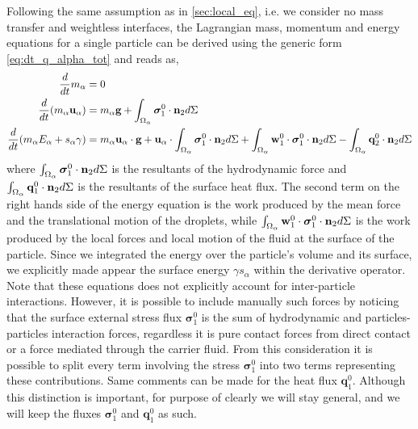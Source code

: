 Following the same assumption as in \ref{sec:local_eq}, i.e. we consider no mass transfer and weightless interfaces, the Lagrangian  mass, momentum and energy equations for a single particle can be derived using the generic form \ref{eq:dt_q_alpha_tot} and reads as, 
\begin{align}
    \label{eq:dt_m_alpha}
    \frac{d}{d t} m_\alpha
    &= 
    0\\
    \label{eq:dt_p_alpha}
    \frac{d}{d t} (m_\alpha \textbf{u}_\alpha)
    &= 
    m_\alpha\textbf{g}
    +  \int_{\Omega_\alpha} \bm{\sigma}_1^0 \cdot \textbf{n}_2 d\Sigma\\
    \label{eq:dt_E_alpha}
    \frac{d}{d t} (m_\alpha E_\alpha + s_\alpha \gamma)
    &= 
    m_\alpha \textbf{u}_\alpha \cdot \textbf{g}
    +\textbf{u}_\alpha \cdot \int_{\Omega_\alpha} \bm{\sigma}_1^0 \cdot \textbf{n}_2 d\Sigma
    +\int_{\Omega_\alpha} \textbf{w}_1^0 \cdot \bm{\sigma}_1^0 \cdot  \textbf{n}_2 d\Sigma 
    - \int_{\Omega_\alpha} \textbf{q}_2^0 \cdot \textbf{n}_2 d\Sigma
\end{align}
where  $\int_{\Omega_\alpha}   \bm{\sigma}_1^0 \cdot \textbf{n}_2  d\Sigma$ is the resultants of the hydrodynamic force and $\int_{\Omega_\alpha}  \textbf{q}_1^0 \cdot \textbf{n}_2  d\Sigma$ is the resultants of the surface heat flux. 
The second term on the right hands side of the energy equation is the work produced by the mean force and the translational motion of the droplets, while $\int_{\Omega_\alpha} \textbf{w}_1^0 \cdot \bm{\sigma}_1^0 \cdot  \textbf{n}_2 d\Sigma$ is the work produced by the local forces and local motion of the fluid at the surface of the particle.
Since we integrated the energy over the particle's volume and its surface, we explicitly made appear the surface energy $\gamma s_\alpha$ within the derivative operator. 
Note that these equations does not explicitly account for inter-particle interactions. 
However, it is possible to include manually such forces by noticing that the surface external stress flux $\bm{\sigma}_1^0$ is the sum of hydrodynamic and particles-particles interaction forces, regardless it is pure contact forces from direct contact or a force mediated through the carrier fluid.
From this consideration it is possible to split every term involving the stress $\bm{\sigma}_1^0$ into two terms representing these contributions. 
Same comments can be made for the heat flux $\textbf{q}_1^0$. 
Although this distinction is important, for purpose of clearly we will stay general, and we will keep the fluxes $\bm{\sigma}_1^0$ and $\textbf{q}_1^0$ as such. 

